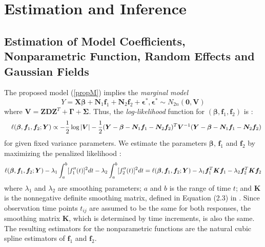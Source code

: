 \documentclass[review]{elsarticle}
\begin{document}
%
%
%
\section{Estimation and Inference} \label{est}


\subsection{Estimation of Model Coefficients, Nonparametric Function, Random Effects and Gaussian Fields} \label{estimation}

The proposed model (\ref{propM})  implies the {\it marginal model}
\[
Y = \boldsymbol{X}\boldsymbol{\beta} +
 \boldsymbol N_{1} \boldsymbol f_1 + 
  \boldsymbol N_{2} \boldsymbol f_2 + \boldsymbol \epsilon^*,   
\boldsymbol \epsilon^* \sim N_{2n}(\boldsymbol 0, \boldsymbol V) 
\]
where $\boldsymbol V = \boldsymbol  Z  \boldsymbol D  \boldsymbol Z^T
  +  \boldsymbol  \Gamma
  +   \boldsymbol \Sigma$.
  Thus, the {\it log-likelihood} function for 
$(\boldsymbol \beta, \boldsymbol f_1, \boldsymbol f_2)$  is :
\begin{eqnarray*}
&& 
\ell (\boldsymbol \beta, \boldsymbol f_1, \boldsymbol f_2; \boldsymbol Y)
\propto
-{1 \over 2} \log |\boldsymbol V| 
 -{1 \over 2}
 (\boldsymbol Y - \boldsymbol\beta 
 - \boldsymbol N_1 \boldsymbol f_1 - \boldsymbol N_2 \boldsymbol f_2)^T 
 \boldsymbol V^{-1} 
  (\boldsymbol Y - \boldsymbol\beta  
  - \boldsymbol N_1 \boldsymbol f_1 - \boldsymbol N_2 \boldsymbol f_2)
\end{eqnarray*}
for given fixed variance parameters.
We   estimate the parameters $\boldsymbol \beta$, $\boldsymbol f_1$ and $\boldsymbol f_2$ by  maximizing  the penalized likelihood \citep*{Wang:Guo:Brow:quan:2000}:
\begin{equation} \label{penLog}
\ell(\mbox{\boldmath$\beta$}, \boldsymbol f_1, \boldsymbol f_2 ; \boldsymbol Y) 
 - \lambda_1\int_a^b [f_1^{\prime\prime}(t)]^2 dt  
 - \lambda_2 \int_a^b [f_2^{\prime\prime}(t)]^2 dt 
= 
\ell(\mbox{\boldmath$\beta$}, \boldsymbol f_1, \boldsymbol f_2 ; \boldsymbol Y) 
- \lambda_1
\boldsymbol f_1^T \boldsymbol K \boldsymbol f_1
 - \lambda_2
\boldsymbol f_2^T \boldsymbol K \boldsymbol f_2 
\end{equation}
where 
$\lambda_1$ and $\lambda_2$ are smoothing parameters; 
$a$ and $b$ is the range of time $t$; and 
$\boldsymbol K$ is the nonnegative definite smoothing matrix, defined in Equation (2.3) in \citet{Green:1994}. 
Since observation time points $t_{ij}$ are assumed to be the same for both responses, the smoothing matrix $\bm K$, which is determined by time increments, is also the same.
The resulting estimators for the nonparametric functions  are  the natural cubic spline estimators  of $\boldsymbol f_1$ and $\boldsymbol f_2$. 
\end{document}
